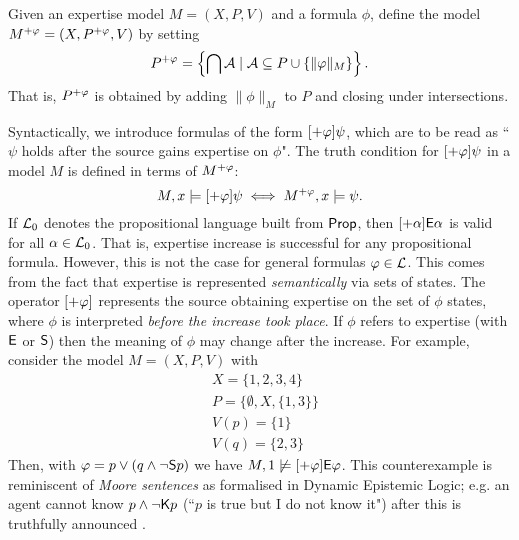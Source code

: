 \begin{definition}
\label{exp_def_expinc_model}
Given an expertise model $M = (X, P, V)$ and a formula $\phi$,
define the model $M^{\expinc\phi} = (X, P^{\expinc\phi}, V)$ by
setting
\[
P^{\expinc\phi}
=
\left\{\bigcap \mathcal{A} \mid \mathcal{A} \subseteq P \cup \{\|\phi\|_M\}\right\}.
\]
That is, $P^{\expinc\phi}$ is obtained by adding
$\|\phi\|_M$ to $P$ and closing under intersections.

\end{definition}

Syntactically, we introduce formulas of the form $[\expinc\phi]\psi$,
which are to be read as ``$\psi$ holds after the source gains expertise on
$\phi$". The truth condition for $[\expinc\phi]\psi$ in a model
$M$ is defined in terms of $M^{\expinc\phi}$:
\[
M, x \models [\expinc\phi]\psi
\iff
M^{\expinc\phi}, x \models \psi.\]
If $\cLzero$ denotes the propositional language built from $\Prop$,
then $[\expinc\alpha]\E\alpha$ is valid for all $\alpha \in
\cLzero$. That is, expertise increase is successful for any propositional
formula. However, this is not the case for general formulas $\phi \in
\cL$. This comes from the fact that expertise is represented \emph{semantically} via
sets of states. The operator $[\expinc\phi]$ represents the source
obtaining expertise on the set of $\phi$ states, where $\phi$ is
interpreted \emph{before the increase took place}. If $\phi$ refers to
expertise (with $\E$ or $\S$) then the meaning of $\phi$ may
change after the increase. For example, consider the model $M = (X, P,
V)$ with
\[
\begin{aligned}
    &X = \{1, 2, 3, 4\} \\
    &P = \{\emptyset, X, \{1, 3\}\} \\
    &V(p) = \{1\} \\
    &V(q) = \{2, 3\}
\end{aligned}\]
Then, with $\phi = p \lor (q \land \neg\S p)$ we have $M, 1 \not\models
[\expinc\phi]\E\phi$.\footnotemark{} This counterexample is reminiscent of
\emph{Moore sentences} as formalised in Dynamic Epistemic Logic; e.g. an agent
cannot know $p \land \neg\K p$ (``$p$ is true but I do not know it") after this
is truthfully announced \cite{baltag2008qualitative}.


